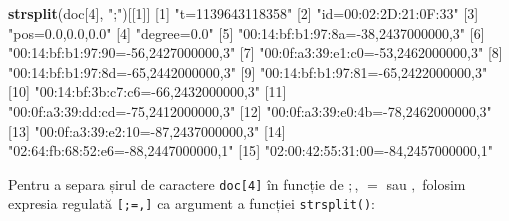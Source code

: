 \documentclass[]{article}
\newenvironment{Shaded}{\begin{snugshade}}{\end{snugshade}}
\newcommand{\KeywordTok}[1]{\textcolor[rgb]{0.13,0.29,0.53}{\textbf{#1}}}
\newcommand{\DecValTok}[1]{\textcolor[rgb]{0.00,0.00,0.81}{#1}}
\newcommand{\StringTok}[1]{\textcolor[rgb]{0.31,0.60,0.02}{#1}}
\newcommand{\NormalTok}[1]{#1}
\begin{document}
\begin{Shaded}
\begin{Highlighting}[]
\KeywordTok{strsplit}\NormalTok{(doc[}\DecValTok{4}\NormalTok{], }\StringTok{";"}\NormalTok{)[[}\DecValTok{1}\NormalTok{]]}
\NormalTok{ [}\DecValTok{1}\NormalTok{] }\StringTok{"t=1139643118358"}                   
\NormalTok{ [}\DecValTok{2}\NormalTok{] }\StringTok{"id=00:02:2D:21:0F:33"}              
\NormalTok{ [}\DecValTok{3}\NormalTok{] }\StringTok{"pos=0.0,0.0,0.0"}                   
\NormalTok{ [}\DecValTok{4}\NormalTok{] }\StringTok{"degree=0.0"}                        
\NormalTok{ [}\DecValTok{5}\NormalTok{] }\StringTok{"00:14:bf:b1:97:8a=-38,2437000000,3"}
\NormalTok{ [}\DecValTok{6}\NormalTok{] }\StringTok{"00:14:bf:b1:97:90=-56,2427000000,3"}
\NormalTok{ [}\DecValTok{7}\NormalTok{] }\StringTok{"00:0f:a3:39:e1:c0=-53,2462000000,3"}
\NormalTok{ [}\DecValTok{8}\NormalTok{] }\StringTok{"00:14:bf:b1:97:8d=-65,2442000000,3"}
\NormalTok{ [}\DecValTok{9}\NormalTok{] }\StringTok{"00:14:bf:b1:97:81=-65,2422000000,3"}
\NormalTok{[}\DecValTok{10}\NormalTok{] }\StringTok{"00:14:bf:3b:c7:c6=-66,2432000000,3"}
\NormalTok{[}\DecValTok{11}\NormalTok{] }\StringTok{"00:0f:a3:39:dd:cd=-75,2412000000,3"}
\NormalTok{[}\DecValTok{12}\NormalTok{] }\StringTok{"00:0f:a3:39:e0:4b=-78,2462000000,3"}
\NormalTok{[}\DecValTok{13}\NormalTok{] }\StringTok{"00:0f:a3:39:e2:10=-87,2437000000,3"}
\NormalTok{[}\DecValTok{14}\NormalTok{] }\StringTok{"02:64:fb:68:52:e6=-88,2447000000,1"}
\NormalTok{[}\DecValTok{15}\NormalTok{] }\StringTok{"02:00:42:55:31:00=-84,2457000000,1"}
\end{Highlighting}
\end{Shaded}

Pentru a separa șirul de caractere \texttt{doc{[}4{]}} în funcție de
\(;\), \(=\) sau \(,\) folosim expresia regulată \texttt{{[};=,{]}} ca
argument a funcției \texttt{strsplit()}:
\end{document}
